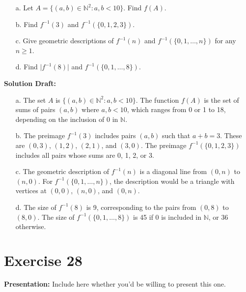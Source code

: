 \documentclass{article}
\begin{document}
\begin{enumerate}
    \item[a.] Let \( A = \{(a, b) \in \mathbb{N}^2 : a, b < 10\} \). Find \( f(A) \).

    \item[b.] Find \( f^{-1}(3) \) and \( f^{-1}(\{0, 1, 2, 3\}) \).

    \item[c.] Give geometric descriptions of \( f^{-1}(n) \) and \( f^{-1}(\{0, 1, \ldots, n\}) \) for any \( n \geq 1 \).

    \item[d.] Find \( \lvert f^{-1}(8) \rvert \) and \( f^{-1}(\{0, 1, \ldots, 8\}) \).
\end{enumerate}

\noindent\textbf{Solution Draft:} 

\begin{enumerate}

\item[a.]
The set \( A \) is \( \{(a, b) \in \mathbb{N}^2 : a, b < 10\} \). The function \( f(A) \) is the set of sums of pairs \( (a, b) \) where \( a, b < 10 \), which ranges from 0 or 1 to 18, depending on the inclusion of 0 in \( \mathbb{N} \).

\item[b.]
The preimage \( f^{-1}(3) \) includes pairs \( (a, b) \) such that \( a + b = 3 \). These are \( (0, 3) \), \( (1, 2) \), \( (2, 1) \), and \( (3, 0) \). The preimage \( f^{-1}(\{0, 1, 2, 3\}) \) includes all pairs whose sums are 0, 1, 2, or 3.

\item[c.]
The geometric description of \( f^{-1}(n) \) is a diagonal line from \( (0, n) \) to \( (n, 0) \). For \( f^{-1}(\{0, 1, \ldots, n\}) \), the description would be a triangle with vertices at \( (0, 0) \), \( (n, 0) \), and \( (0, n) \).

\item[d.]
The size of \( f^{-1}(8) \) is 9, corresponding to the pairs from \( (0, 8) \) to \( (8, 0) \). The size of \( f^{-1}(\{0, 1, \ldots, 8\}) \) is 45 if 0 is included in \( \mathbb{N} \), or 36 otherwise.
\end{enumerate}

\section*{Exercise 28}  

\noindent\textbf{Presentation:} Include here whether you'd be willing to present this one. 
\end{document}
